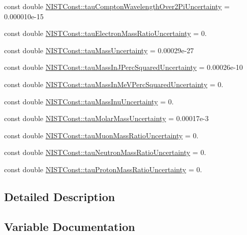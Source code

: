 \begin{DoxyCompactItemize}
\item 
const double \hyperlink{group___tau_gab9853e108c4a32f465e14d286cedde7c}{N\+I\+S\+T\+Const\+::tau\+Compton\+Wavelength\+Over2\+Pi\+Uncertainty} = 0.\+000010e-\/15
\item 
const double \hyperlink{group___tau_ga8c2df29fcfd51464a59702fef9b2082a}{N\+I\+S\+T\+Const\+::tau\+Electron\+Mass\+Ratio\+Uncertainty} = 0.
\item 
const double \hyperlink{group___tau_gad7d60828078581e6fc33f24fa369b9f2}{N\+I\+S\+T\+Const\+::tau\+Mass\+Uncertainty} = 0.\+00029e-\/27
\item 
const double \hyperlink{group___tau_gafe24bdc066842941bc493cfaa799ccf4}{N\+I\+S\+T\+Const\+::tau\+Mass\+In\+J\+Perc\+Squared\+Uncertainty} = 0.\+00026e-\/10
\item 
const double \hyperlink{group___tau_ga0778d216f366092aaf0b3a3bbb5a731e}{N\+I\+S\+T\+Const\+::tau\+Mass\+In\+Me\+V\+Perc\+Squared\+Uncertainty} = 0.
\item 
const double \hyperlink{group___tau_gad6e1aecdf7331e89b665c40d7d6dad86}{N\+I\+S\+T\+Const\+::tau\+Mass\+Inu\+Uncertainty} = 0.
\item 
const double \hyperlink{group___tau_ga8c1b32660badce1280d13a252cae4141}{N\+I\+S\+T\+Const\+::tau\+Molar\+Mass\+Uncertainty} = 0.\+00017e-\/3
\item 
const double \hyperlink{group___tau_gab6f6e5f07b2e4e5623fa2edf6b163e53}{N\+I\+S\+T\+Const\+::tau\+Muon\+Mass\+Ratio\+Uncertainty} = 0.
\item 
const double \hyperlink{group___tau_ga65d53ed3744dc7b5926ea16b9c62e185}{N\+I\+S\+T\+Const\+::tau\+Neutron\+Mass\+Ratio\+Uncertainty} = 0.
\item 
const double \hyperlink{group___tau_ga8c32666623ba327b9d6d8d376fdbad3c}{N\+I\+S\+T\+Const\+::tau\+Proton\+Mass\+Ratio\+Uncertainty} = 0.
\end{DoxyCompactItemize}


\subsection{Detailed Description}


\subsection{Variable Documentation}
\mbox{\label{group___tau_ga02608ef1c26b9550ee7547350bbcdd5d}} 
